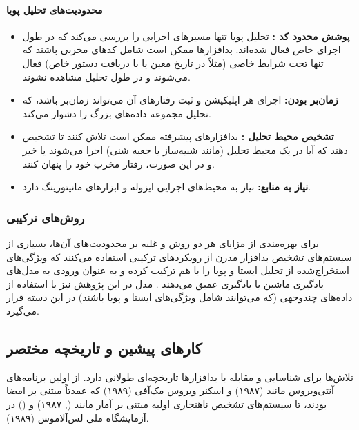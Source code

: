 \paragraph{محدودیت‌های تحلیل پویا}
\begin{itemize}
    \renewcommand{\labelitemi}{\lr{$\bullet$}}
    \item \textbf{پوشش محدود کد :} تحلیل پویا تنها مسیرهای اجرایی را بررسی می‌کند که در طول اجرای خاص فعال شده‌اند. بدافزارها ممکن است شامل کدهای مخربی باشند که تنها تحت شرایط خاصی (مثلاً در تاریخ معین یا با دریافت دستور خاص) فعال می‌شوند و در طول تحلیل مشاهده نشوند.
    \item \textbf{زمان‌بر بودن:} اجرای هر اپلیکیشن و ثبت رفتارهای آن می‌تواند زمان‌بر باشد، که تحلیل مجموعه داده‌های بزرگ را دشوار می‌کند.
    \item \textbf{تشخیص محیط تحلیل :} بدافزارهای پیشرفته ممکن است تلاش کنند تا تشخیص دهند که آیا در یک محیط تحلیل (مانند شبیه‌ساز یا جعبه شنی) اجرا می‌شوند یا خیر و در این صورت، رفتار مخرب خود را پنهان کنند.
    \item \textbf{نیاز به منابع:} نیاز به محیط‌های اجرایی ایزوله و ابزارهای مانیتورینگ دارد.
\end{itemize}

\subsubsection{روش‌های ترکیبی }
برای بهره‌مندی از مزایای هر دو روش و غلبه بر محدودیت‌های آن‌ها، بسیاری از سیستم‌های تشخیص بدافزار مدرن از رویکردهای ترکیبی استفاده می‌کنند که ویژگی‌های استخراج‌شده از تحلیل ایستا و پویا را با هم ترکیب کرده و به عنوان ورودی به مدل‌های یادگیری ماشین یا یادگیری عمیق می‌دهند \cite{DeepLearningMalware}. مدل  در این پژوهش نیز با استفاده از داده‌های چندوجهی (که می‌توانند شامل ویژگی‌های ایستا و پویا باشند) در این دسته قرار می‌گیرد.

\subsection{کارهای پیشین و تاریخچه مختصر}
تلاش‌ها برای شناسایی و مقابله با بدافزارها تاریخچه‌ای طولانی دارد. از اولین برنامه‌های آنتی‌ویروس مانند  (۱۹۸۷) و اسکنر ویروس مک‌آفی (۱۹۸۹) که عمدتاً مبتنی بر امضا بودند، تا سیستم‌های تشخیص ناهنجاری اولیه مبتنی بر آمار مانند  (, ۱۹۸۷) و  () در آزمایشگاه ملی لس‌آلاموس (۱۹۸۹).

